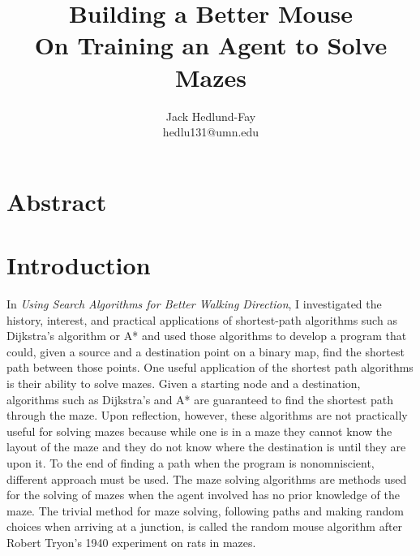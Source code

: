 \documentclass[12pt]{article}
\author{
Jack Hedlund-Fay\\hedlu131@umn.edu
}
\title {Building a Better Mouse \\
\large On Training an Agent to Solve Mazes}
\begin{document}
\maketitle

\renewcommand{\theenumii}{\arabic{enumii}}
\renewcommand{\labelenumii}{\theenumii)}
\renewcommand{\theenumiii}{\arabic{enumiii}}
\renewcommand{\labelenumiii}{\theenumiii.}

\section{Abstract}

\section{Introduction}

\hspace*{\parindent} In \textit{Using Search Algorithms for Better Walking Direction}, I investigated the history, interest, and practical applications of shortest-path algorithms such as Dijkstra's algorithm or A* and used those algorithms to develop a program that could, given a source and a destination point on a binary map, find the shortest path between those points. One useful application of the shortest path algorithms is their ability to solve mazes. Given a starting node and a destination, algorithms such as Dijkstra's and A* are guaranteed to find the shortest path through the maze. Upon reflection, however, these algorithms are not practically useful for solving mazes because while one is in a maze they cannot know the layout of the maze and they do not know where the destination is until they are upon it. To the end of finding a path when the program is nonomniscient, different approach must be used. The maze solving algorithms are methods used for the solving of mazes when the agent involved has no prior knowledge of the maze. The trivial method for maze solving, following paths and making random choices when arriving at a junction, is called the random mouse algorithm after Robert Tryon's 1940 experiment on rats in mazes.
\end{document}
